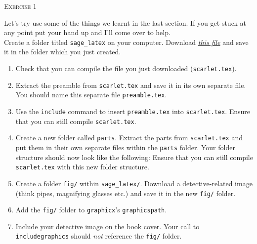\documentclass{article}
\begin{document}
\begin{center}
  \Large\color{black!80}\textsc{Exercise 1}
\end{center}

Let's try use some of the things we learnt in the last section. If you
get stuck at any point put your hand up and I'll come over to help.\\

Create a folder titled \texttt{sage\_latex} on your computer. Download
\href{https://jwalton.info/assets/teaching/latex/scarlet.tex}{\emph{this file}} 
and save it in the folder which you just created.

\begin{enumerate}[label=\color{purple}\theenumi.]

  \item Check that you can compile the file you just downloaded
    (\texttt{scarlet.tex}).

  \item Extract the preamble from \texttt{scarlet.tex} and save it in its own
    separate file. You should name this separate file
    \texttt{preamble.tex}.

  \item Use the \texttt{\tb include} command to insert
    \texttt{preamble.tex} into \texttt{scarlet.tex}. Ensure that you can
    still compile \texttt{scarlet.tex}.

  \item{Create a new folder called \texttt{parts}. Extract the parts from 
    \texttt{scarlet.tex} and put them in their own separate files within
    the \texttt{parts} folder. Your folder structure should now look
    like the following:
    \vspace{0.25cm}
    Ensure that you can still compile \texttt{scarlet.tex} with this new 
    folder structure.}

  \item Create a folder \texttt{fig/} within \texttt{sage\_latex/}. Download a
    detective-related image (think pipes, magnifying glasses etc.) and
    save it in the new \texttt{fig/} folder.

  \item Add the \texttt{fig/} folder to \texttt{graphicx}'s
    \texttt{graphicspath}.

  \item Include your detective image on the book cover. Your call to
    \texttt{\tb includegraphics} should \emph{not} reference the
    \texttt{fig/} folder.
    

\end{enumerate}
\end{document}
